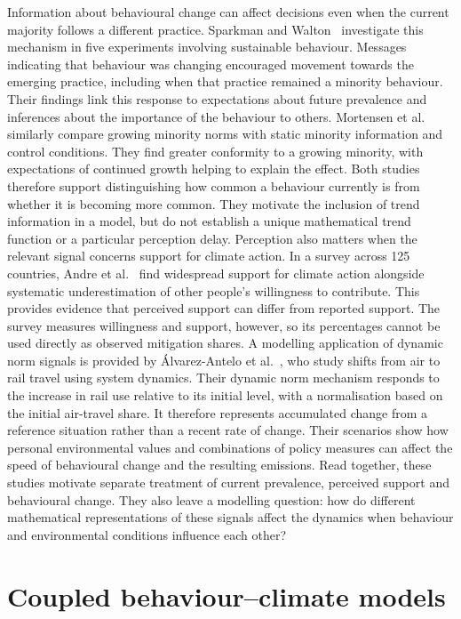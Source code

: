 Information about behavioural change can affect decisions even when the current majority follows a
different practice. Sparkman and Walton~\cite{sparkman2017dynamic} investigate this mechanism in five
experiments involving sustainable behaviour. Messages indicating that behaviour was changing encouraged
movement towards the emerging practice, including when that practice remained a minority behaviour. Their
findings link this response to expectations about future prevalence and inferences about the importance
of the behaviour to others. Mortensen et al.~\cite{mortensen2019trending} similarly compare growing
minority norms with static minority information and control conditions. They find greater conformity to a
growing minority, with expectations of continued growth helping to explain the effect. Both studies
therefore support distinguishing how common a behaviour currently is from whether it is becoming more
common. They motivate the inclusion of trend information in a model, but do not establish a unique
mathematical trend function or a particular perception delay. Perception also matters when the relevant
signal concerns support for climate action. In a survey across 125 countries, Andre et
al.~\cite{andre2024support} find widespread support for climate action alongside systematic
underestimation of other people's willingness to contribute. This provides evidence that perceived
support can differ from reported support. The survey measures willingness and support, however, so its
percentages cannot be used directly as observed mitigation shares. A modelling application of dynamic
norm signals is provided by \'Alvarez-Antelo et al.~\cite{alvarez2025mobility}, who study shifts from air
to rail travel using system dynamics. Their dynamic norm mechanism responds to the increase in rail use
relative to its initial level, with a normalisation based on the initial air-travel share. It therefore
represents accumulated change from a reference situation rather than a recent rate of change. Their
scenarios show how personal environmental values and combinations of policy measures can affect the speed
of behavioural change and the resulting emissions. Read together, these studies motivate separate
treatment of current prevalence, perceived support and behavioural change. They also leave a modelling
question: how do different mathematical representations of these signals affect the dynamics when
behaviour and environmental conditions influence each other?

\section{Coupled behaviour--climate models}
\label{sec:related-coupled-models}

